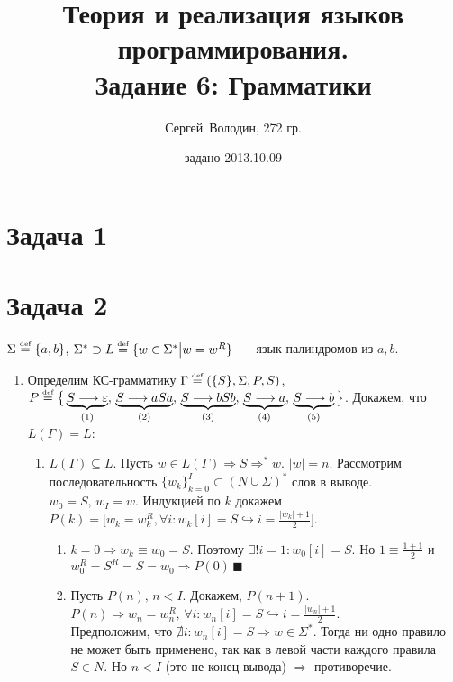 \documentclass[a4paper]{article}
\title{Теория и реализация языков программирования.\\Задание 6: Грамматики}
\date{задано 2013.10.09}
\author{Сергей~Володин, 272 гр.}
\def\eqdef{\overset{\mbox{\tiny def}}{=}}
\begin{document}
\maketitle
\section*{Задача 1}
\section*{Задача 2}
$\Sigma\eqdef\{a,b\}$, $\Sigma^*\supset L\eqdef\{w\in\Sigma^*\big|w=w^R\}$~--- язык палиндромов из $a,b$.
\begin{enumerate}
\def\ansba{$\Gamma\eqdef(\{S\},\Sigma,P,S)$, $P\eqdef\big\{\underbrace{S\longrightarrow\varepsilon}_{(1)},\,\underbrace{S\longrightarrow aSa}_{(2)},\,\underbrace{S\longrightarrow bSb}_{(3)},\,\underbrace{S\longrightarrow a}_{(4)},\,\underbrace{S\longrightarrow b}_{(5)}\big\}$}
\def\ansbac{\Gamma\eqdef(\{S\},\Sigma,P,S)$, $P\eqdef\big\{S\longrightarrow\varepsilon,\,S\longrightarrow aSa,\,S\longrightarrow bSb,\,S\longrightarrow a,\,S\longrightarrow b\big\}}
\item Определим КС-грамматику \ansba.\newline
Докажем, что $L(\Gamma)=L$:
\begin{enumerate}
\item $L(\Gamma)\subseteq L$. Пусть $w\in L(\Gamma)\Rightarrow S\Longrightarrow^* w$. $|w|=n$. Рассмотрим последовательность $\{w_k\}^I_{k=0}\subset (N\cup\Sigma)^*$ слов в выводе. $w_0=S,\,w_I=w$. Индукцией по $k$ докажем $P(k)=\big[w_k=w_k^R,\forall i\colon w_k[i]=S\hookrightarrow i=\frac{|w_k|+1}{2}\big]$.\begin{enumerate}[1.]
\item $k=0\Rightarrow w_k\equiv w_0=S$. Поэтому $\exists ! i=1\colon w_0[i]=S$. Но $1\equiv\frac{1+1}{2}$ и $w_0^R=S^R=S=w_0\Rightarrow P(0)\,\blacksquare$
\item Пусть $P(n),\,n<I$. Докажем, $P(n+1)$. $P(n)\Rightarrow w_n=w_n^R,\,\forall i\colon w_n[i]=S\hookrightarrow i=\frac{|w_n|+1}{2}$.
\\[1pt]
Предположим, что $\nexists i\colon w_n[i]=S\Rightarrow w\in \Sigma^*$. Тогда ни одно правило не может быть применено, так как в левой части каждого правила $S\in N$. Но $n<I$ (это не конец вывода) $\Rightarrow$ противоречие.

\end{enumerate}
\end{enumerate}
\end{enumerate}
\end{document}
